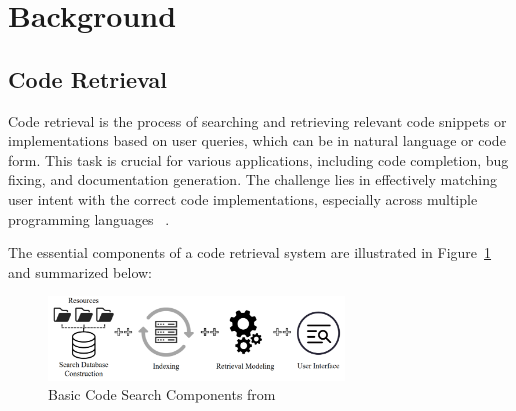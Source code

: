\documentclass[12pt]{article}
\begin{document}
\section{Background}




\subsection{Code Retrieval}

Code retrieval is the process of searching and retrieving relevant code snippets or implementations based on user queries, which can be in natural language or code form. This task is crucial for various applications, including code completion, bug fixing, and documentation generation. The challenge lies in effectively matching user intent with the correct code implementations, especially across multiple programming languages ~\cite{Kim2021}.

The essential components of a code retrieval system are illustrated in Figure~\ref{fig:code-search-components} and summarized below:

\begin{figure}[ht]
\centering
\includegraphics[width=0.7\textwidth]{images/code-search-components.png}
\caption{Basic Code Search Components from \cite{Kim2021}}
\label{fig:code-search-components}
\end{figure}
\end{document}
